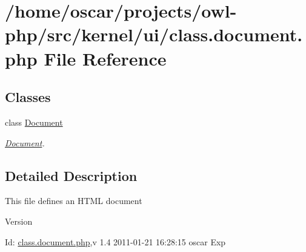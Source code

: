 \section{/home/oscar/projects/owl-\/php/src/kernel/ui/class.document.php File Reference}
\label{class_8document_8php}
\subsection*{Classes}
\begin{DoxyCompactItemize}
\item 
class \hyperlink{classDocument}{Document}
\begin{DoxyCompactList}\small\item\em \hyperlink{classDocument}{Document}. \item\end{DoxyCompactList}\end{DoxyCompactItemize}


\subsection{Detailed Description}
This file defines an HTML document \begin{DoxyVersion}{Version}

\end{DoxyVersion}
\begin{DoxyParagraph}{Id:}
\hyperlink{class_8document_8php}{class.document.php},v 1.4 2011-\/01-\/21 16:28:15 oscar Exp 
\end{DoxyParagraph}
